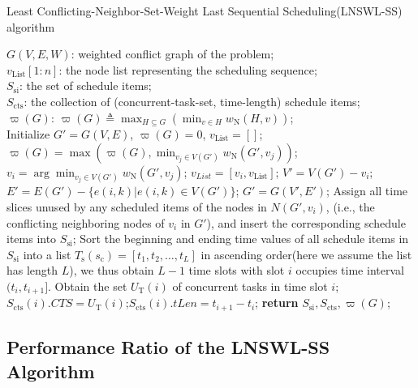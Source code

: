 \documentclass[journal,10pt]{IEEEtran}
\begin{document}
\begin{algorithm}[!htb]
\caption{Least Conflicting-Neighbor-Set-Weight Last Sequential Scheduling(LNSWL-SS) algorithm}
\begin{algorithmic}[1]\label{Alg_LNSWL_SS}
    \REQUIRE $G(V,E,W)$: weighted conflict graph of the problem;\\
    \ENSURE $v_\text{List}[1{:}n]$: the node list representing the scheduling sequence;\\
    $S_\text{si}$: the set of schedule items;\\
    $S_\text{cts}$: the collection of (concurrent-task-set, time-length) schedule items;\\
    $\varpi(G)$: $\varpi(G){\triangleq}\max_{H{\subseteq}G}(\min_{v{\in}H}w_\text{N}(H,v))$; \\
    \STATE Initialize $G'{=}G(V,E)$, $\varpi(G){=}0$, $v_\text{List}{=}[]$;
    \label{seqbegin}
        \STATE $\varpi(G){=}\max(\varpi(G),\min_{v_j{\in}V(G')}w_\text{N}(G',v_j))$;\label{v_update}
        \STATE $v_i{=}\arg\min_{v_j{\in}V(G')}w_\text{N}(G',v_j)$; $v_{List}=[v_i,v_\text{List}]$;
        \STATE $V'{=}V(G'){-}v_i$; $E'{=}E(G'){-}\{e(i,k)|e(i,k){\in}V(G')\}$;
        \STATE $G'{=}G(V',E')$;
    \ENDWHILE \label{seqend}
     \label{schbegin}
        \STATE Assign all time slices unused by any scheduled items of the nodes in $N(G',v_i)$, (i.e., the conflicting neighboring nodes of $v_i$ in $G'$), and insert the corresponding schedule items into $S_\text{si}$;
    \ENDFOR \label{schend}
    \STATE Sort the beginning and ending time values of all schedule items in $S_\text{si}$ into a list $T_\text{s}(s_\text{c}){=}[t_1,t_2,\ldots,t_{L}]$ in ascending order(here we assume the list has length $L$), we thus obtain $L{-}1$ time slots with slot $i$ occupies time interval $(t_{i},t_{i{+}1}]$.\label{ctsbegin}
        \STATE Obtain the set $U_\text{T}(i)$ of concurrent tasks in time slot $i$;
        \STATE $S_\text{cts}(i).CTS{=}U_\text{T}(i)$;$S_\text{cts}(i).tLen{=}t_{i{+}1}{-}t_{i}$;
    \ENDFOR \label{ctsend}
    \STATE \textbf{return} $S_\text{si}, S_\text{cts}, \varpi(G)$;
\end{algorithmic}
\end{algorithm}

\subsection{Performance Ratio of the LNSWL-SS Algorithm}
\end{document}
